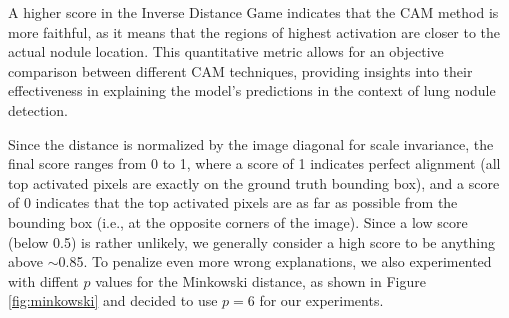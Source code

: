 A higher score in the Inverse Distance Game indicates that the CAM method is more faithful, as it means that the regions of highest activation are closer to the actual nodule location. This quantitative metric allows for an objective comparison between different CAM techniques, providing insights into their effectiveness in explaining the model's predictions in the context of lung nodule detection.

Since the distance is normalized by the image diagonal for scale invariance, the final score ranges from 0 to 1, where a score of 1 indicates perfect alignment (all top activated pixels are exactly on the ground truth bounding box), and a score of 0 indicates that the top activated pixels are as far as possible from the bounding box (i.e., at the opposite corners of the image).
Since a low score (below 0.5) is rather unlikely, we generally consider a high score to be anything above $\sim$0.85. To penalize even more wrong explanations, we also experimented with diffent $p$ values for the Minkowski distance, as shown in Figure \ref{fig:minkowski} and decided to use $p=6$ for our experiments.





